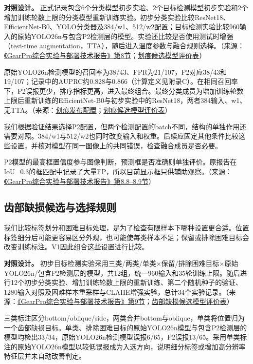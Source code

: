 \textbf{对照设计。} 正式记录包含6个分类模型初步实验、2个目标检测模型初步实验和2个增加训练轮数上限的分类模型重新训练实验。初步分类实验比较ResNet18、EfficientNet-B0、YOLO分类器及384/w1、512/w2配置；目标检测实验比较960输入的原始YOLO26n与包含P2检测层的模型。实验还比较是否使用测试时增强（test-time augmentation，TTA），随后进入温度参数与融合规则选择。（来源：\protect\href{run:../GearPro_综合技术报告_Markdown含配图/GearPro_综合实验与部署技术报告.md}{《GearPro综合实验与部署技术报告》第8节}；\protect\hyperlink{source-7}{划痕候选模型评价表}）

原始YOLO26n检测模型的召回率为38/43、FPR为21/107，P2对应38/43和19/107；记录中的AUPRC约0.828与0.866（计算定义见附录C）。在相同召回率下，P2误报更少，排序指标更高，进入最终组合。最终分类成员为增加训练轮数上限后重新训练的EfficientNet-B0与初步实验中的ResNet18，两者384输入、w1、无TTA。（来源：\protect\hyperlink{source-1}{划痕发布配置}；\protect\hyperlink{source-7}{划痕候选模型评价表}）

我们根据验证结果选择P2配置，但两个检测配置的batch不同，结构的单独作用还需要对照。384/w1与512/w2也同时改变输入和权重。后续应固定其他条件比较这些设置，并核对模型在同一图像上的共同错误，检查融合成员是否必要。

P2模型的最高框置信度参与图像判断，预测框是否准确则单独评价。原报告在IoU=0.3的框匹配中记录了大量FP，所以目前显示框只供辅助观察。（来源：\protect\href{run:../GearPro_综合技术报告_Markdown含配图/GearPro_综合实验与部署技术报告.md}{《GearPro综合实验与部署技术报告》第8.8--8.9节}）

\FloatBarrier{}\subsection{齿部缺损候选与选择规则}
我们比较标签划分和困难目标处理，是为了检查有限样本下哪种设置更合适。位置标签细分后可能更容易区分外观，也可能使每类样本不足；保留或排除困难目标会改变训练标注。V1因此组合这些设置进行比较。

\textbf{对照设计。} 初步目标检测实验采用三类/两类/单类\ensuremath{\times}保留/排除困难目标\ensuremath{\times}原始YOLO26n/包含P2检测层的模型，共12组，统一960输入和35轮训练上限。随后进行12个初步分类实验、增加训练轮数上限的重新训练、第二个随机种子的验证、1280输入对照及困难样本重采样与CLAHE增强实验，总计34个实验记录。（来源：\protect\href{run:../GearPro_综合技术报告_Markdown含配图/GearPro_综合实验与部署技术报告.md}{《GearPro综合实验与部署技术报告》第9节}；\protect\hyperlink{source-8}{齿部缺损候选模型评价表}）

三类标注区分bottom/oblique/side，两类合并bottom与oblique，单类将位置归为一个齿部缺损目标。单类、排除困难目标的原始YOLO26n模型与包含P2检测层的模型均检出33/34，原始YOLO26n检测模型误报6/65，P2误报13/65。采用单类标注的原始YOLO26n模型以较低误报成为入选方向，说明细分标签或增加高分辨率特征层并未自动改善判定。


